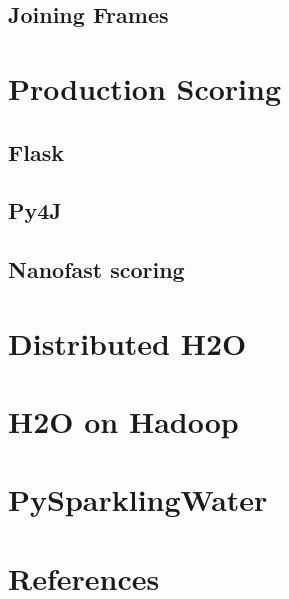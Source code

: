 \subsection{Joining Frames}

\section{Production Scoring}

\subsection{Flask}

\subsection{Py4J}

\subsection{Nanofast scoring}

\section{Distributed H2O}

\section{H2O on Hadoop}

\section{PySparklingWater}





\newpage
\section{References}








\enddocument